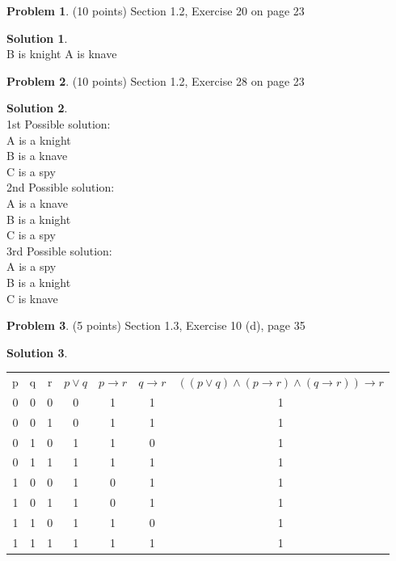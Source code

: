 \documentclass{article}
\theoremstyle{definition}
\newtheorem{problem}{Problem}
\newtheorem*{solution}{Solution}
\begin{document}
\begin{problem} (10 points) Section 1.2, Exercise 20 on page 23
\end{problem}
\begin{solution}~\\
B is knight
A is knave
\end{solution}

\begin{problem} (10 points) Section 1.2, Exercise 28 on page 23
\end{problem}
\begin{solution}~\\
1st Possible solution: \\
A is a knight\\
B is a knave\\
C is a spy\\
2nd Possible solution:\\
A is a knave\\
B is a knight\\
C is a spy\\
3rd Possible solution:\\
A is a spy\\
B is a knight\\
C is knave\\
\end{solution}

\begin{problem} (5 points)
Section 1.3, Exercise 10 (d), page 35
\end{problem}
\begin{solution} ~\\
\begin{tabular} {| c | c | c | c | c | c | c |}
  p & q & r & $p \lor q$ & $p \to r$ & $q \to r$ & $((p \lor q) \land (p \to r) \land (q \to r)) \to r$ \\
  0 & 0 & 0 & 0        & 1       & 1       & 1\\
  0 & 0 & 1 & 0        & 1       & 1       & 1\\
  0 & 1 & 0 & 1        & 1       & 0       & 1\\
  0 & 1 & 1 & 1        & 1       & 1       & 1\\
  1 & 0 & 0 & 1        & 0       & 1       & 1\\
  1 & 0 & 1 & 1        & 0       & 1       & 1\\
  1 & 1 & 0 & 1        & 1       & 0       & 1\\
  1 & 1 & 1 & 1        & 1       & 1       & 1\\
\end{tabular}
\end{solution}
\end{document}
